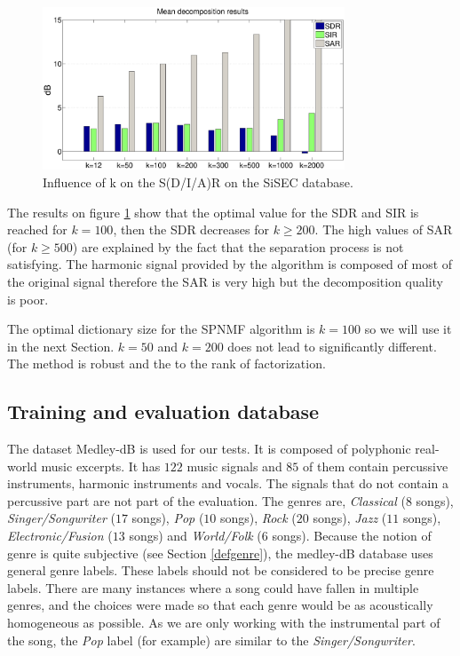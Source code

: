 \documentclass{article}
\begin{document}
\begin{figure}[h]

  \centering 
  \includegraphics[width=9cm]{figs/AllDictSizeISMIR.eps}
  \caption{\label{dictsize}Influence of k on the S(D/I/A)R on the SiSEC database.}
  
\end{figure}

The results on figure \ref{dictsize} show that the optimal value for the SDR and SIR is reached for $k=100$, then the SDR decreases for $k\geqslant 200$. The high values of SAR (for $k\geqslant 500$) are explained by the fact that the separation process is not satisfying. The harmonic signal provided by the algorithm is composed of most of the original signal therefore the SAR is very high but the decomposition quality is poor. 

The optimal dictionary size for the SPNMF algorithm is $k=100$ so we will use it in the next Section. $k=50$ and $k=200$ does not lead to significantly different. The method is robust and the to the rank of factorization. 

\subsection{Training and evaluation database}\label{database}

The dataset Medley-dB \cite{bittner2014medleydb} is used for our tests. It is composed of polyphonic real-world music excerpts. It has $122$ music signals and $85$ of them contain percussive instruments, harmonic instruments and vocals. The signals that do not contain a percussive part are not part of the evaluation. The genres are, \emph{Classical} ($8$ songs), \emph{Singer/Songwriter} ($17$ songs), \emph{Pop} ($10$ songs), \emph{Rock} ($20$ songs), \emph{Jazz} ($11$ songs), \emph{Electronic/Fusion} ($13$ songs) and \emph{World/Folk} ($6$ songs). Because the notion of genre is quite subjective (see Section \ref{defgenre}), the medley-dB database uses general genre labels. These labels should not be considered to be precise genre labels. There are many instances where a song could have fallen in multiple genres, and the choices were made so that each genre would be as acoustically homogeneous as possible. As we are only working with the instrumental part of the song, the \emph{Pop} label (for example) are similar to the \emph{Singer/Songwriter}.
\end{document}
